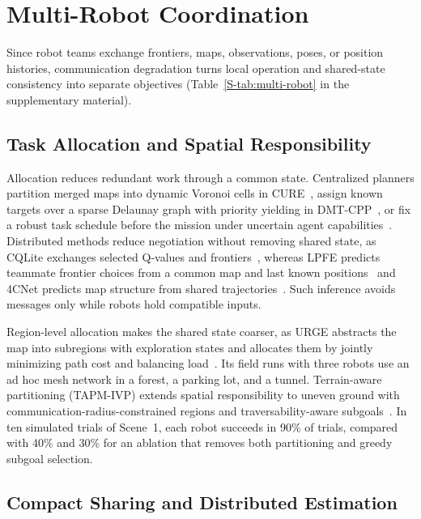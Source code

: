 \section{Multi-Robot Coordination}
\label{sec:multi}

Since robot teams exchange frontiers, maps, observations, poses, or position histories, communication degradation turns local operation and shared-state consistency into separate objectives (Table~\ref{S-tab:multi-robot} in the supplementary material).

\subsection{Task Allocation and Spatial Responsibility}

Allocation reduces redundant work through a common state. Centralized planners partition merged maps into dynamic Voronoi cells in CURE~\cite{P_M17}, assign known targets over a sparse Delaunay graph with priority yielding in DMT-CPP~\cite{P_E35}, or fix a robust task schedule before the mission under uncertain agent capabilities~\cite{P_M32}. Distributed methods reduce negotiation without removing shared state, as CQLite exchanges selected Q-values and frontiers~\cite{P_M25}, whereas LPFE predicts teammate frontier choices from a common map and last known positions~\cite{P_E34} and 4CNet predicts map structure from shared trajectories~\cite{P_E33}. Such inference avoids messages only while robots hold compatible inputs.

Region-level allocation makes the shared state coarser, as URGE abstracts the map into subregions with exploration states and allocates them by jointly minimizing path cost and balancing load~\cite{P_R22}. Its field runs with three robots use an ad hoc mesh network in a forest, a parking lot, and a tunnel. Terrain-aware partitioning (TAPM-IVP) extends spatial responsibility to uneven ground with communication-radius-constrained regions and traversability-aware subgoals~\cite{P_F09}. In ten simulated trials of Scene~1, each robot succeeds in 90\% of trials, compared with 40\% and 30\% for an ablation that removes both partitioning and greedy subgoal selection.

\subsection{Compact Sharing and Distributed Estimation}

